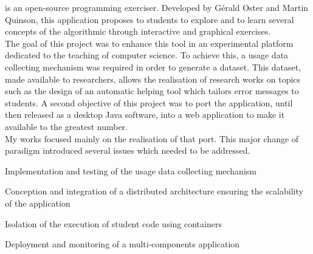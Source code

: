 \documentclass[]{deedy-resume-openfont}
\begin{document}
\hfill\begin{minipage}{\dimexpr\textwidth-0.5cm}
\renewcommand\refname{\vskip -20pt} %


\nocite{*}
\end{minipage}

\hfill\begin{minipage}{\dimexpr\textwidth-0.5cm}
\href{http://people.irisa.fr/Martin.Quinson/Teaching/PLM/}{}
is an open-source programming exerciser.
Developed by Gérald Oster and Martin Quinson, this application proposes to students
to explore and to learn several concepts of the algorithmic through interactive and graphical exercises.
\\
The goal of this project was to enhance this tool in an experimental platform dedicated
to the teaching of computer science.
To achieve this, a usage data collecting mechanism was required in order to generate a dataset.
This dataset, made available to researchers, allows the realisation of research works on topics
such as the design of an automatic helping tool which tailors error messages to students.
A second objective of this project was to port the application, until then released as
a desktop Java software, into a web application to make it available to the greatest number.
\\
My works focused mainly on the realisation of that port.
This major change of paradigm introduced several issues which needed to be addressed.
\begin{tightemize}
    \item Implementation and testing of the usage data collecting mechanism
    \item Conception and integration of a distributed architecture ensuring the scalability of the application
    \item Isolation of the execution of student code using containers
    \item Deployment and monitoring of a multi-components application
\end{tightemize}
\sectionsep\xdef\tpd{\the\prevdepth}
\end{minipage}

\sectionsep
\end{document}
